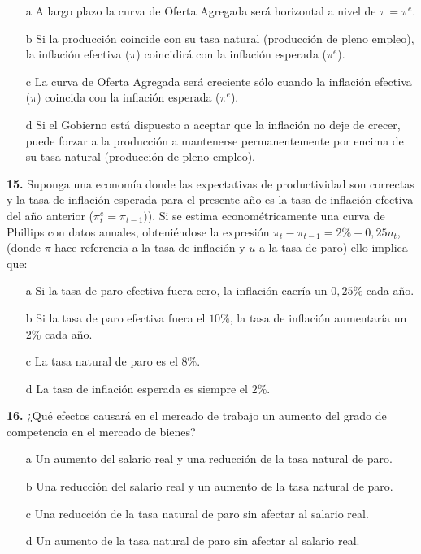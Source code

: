 \documentclass{nuevotema}
\begin{document}
\begin{itemize}
	\item[a] A largo plazo la curva de Oferta Agregada será horizontal a nivel de $\pi = \pi^e$.
	\item[b] Si la producción coincide con su tasa natural (producción de pleno empleo), la inflación efectiva ($\pi$) coincidirá con la inflación esperada ($\pi^e$).
	\item[c] La curva de Oferta Agregada será creciente sólo cuando la inflación efectiva ($\pi$) coincida con la inflación esperada ($\pi^e$).
	\item[d] Si el Gobierno está dispuesto a aceptar que la inflación no deje de crecer, puede forzar a la producción a mantenerse permanentemente por encima de su tasa natural (producción de pleno empleo).
\end{itemize}



\textbf{15.} Suponga una economía donde las expectativas de productividad son correctas y la tasa de inflación esperada para el presente año es la tasa de inflación efectiva del año anterior ($\pi^e_t = \pi_{t-1})$). Si se estima econométricamente una curva de Phillips con datos anuales, obteniéndose la expresión $\pi_t - \pi_{t-1} = 2\% - 0,25u_t$, (donde $\pi$ hace referencia a la tasa de inflación y $u$ a la tasa de paro) ello implica que:

\begin{itemize}
	\item[a] Si la tasa de paro efectiva fuera cero, la inflación caería un $0,25\%$ cada año.
	\item[b] Si la tasa de paro efectiva fuera el $10\%$, la tasa de inflación aumentaría un $2\%$ cada año.
	\item[c] La tasa natural de paro es el $8\%$.
	\item[d] La tasa de inflación esperada es siempre el $2\%$.
\end{itemize}

\textbf{16.} ¿Qué efectos causará en el mercado de trabajo un aumento del grado de competencia en el mercado de bienes?

\begin{itemize}
	\item[a] Un aumento del salario real y una reducción de la tasa natural de paro.
	\item[b] Una reducción del salario real y un aumento de la tasa natural de paro.
	\item[c] Una reducción de la tasa natural de paro sin afectar al salario real.
	\item[d] Un aumento de la tasa natural de paro sin afectar al salario real.
\end{itemize}
\end{document}
